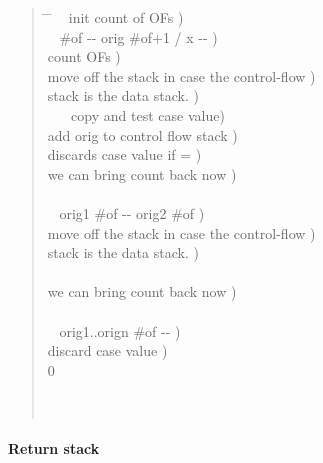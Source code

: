 \begin{quote}\ttfamily
  \begin{tabbing}
	\tab \= \hspace{10em} \=    ~  init count of OFs ) \\[2\parskip]

	\+ \word{:} ~  \#of -{}- orig \#of+1 / x -{}- ) \\
							\>  count OFs ) \\
							\>  move off the stack in case the control-flow ) \\
									\>  stack is the data stack. ) \\
		 ~  \word{=}~
								 copy and test case value) \\
		 	\>  add orig to control flow stack ) \\
		 	\>  discards case value if = ) \\
	\-					\>  we can bring count back now ) \\
	\word{;}  \\[2\parskip]

	\+ \word{:} ~  orig1 \#of -{}- orig2 \#of ) \\
							\>  move off the stack in case the control-flow ) \\
									\>  stack is the data stack. ) \\
		  \\
	\-					\>  we can bring count back now ) \\
	\word{;}  \\[2\parskip]

	\+ \word{:} ~  orig1..orign \#of -{}- ) \\
		 	\>  discard case value ) \\
		0  \\
		\tab {}  \\
	\-  \\
	\word{;} 
  \end{tabbing}
\end{quote}


\paragraph{Return stack} ~ %

